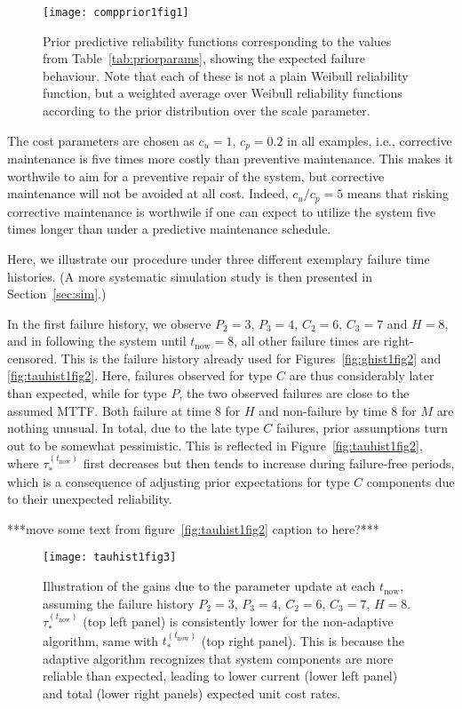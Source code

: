 \documentclass[authoryear]{elsarticle}
\def\tnow{t_\text{now}}
\newcommand{\tausnow}{\tau_*^{(\tnow)}}
\newcommand{\tstarnow}{t_*^{(\tnow)}}
\begin{document}
\begin{figure}
\centering
\texttt{[image: compprior1fig1]}
\caption{Prior predictive reliability functions corresponding to the values from Table~\ref{tab:priorparams},
showing the expected failure behaviour.
Note that each of these is not a plain Weibull reliability function,
but a weighted average over Weibull reliability functions according to the prior distribution over the scale parameter.}
\label{fig:compprior1fig1}
\end{figure}

The cost parameters are chosen as $c_u = 1$, $c_p = 0.2$ in all examples,
i.e., corrective maintenance is five times more costly than preventive maintenance.
This makes it worthwile to aim for a preventive repair of the system,
but corrective maintenance will not be avoided at all cost.
Indeed, $c_u / c_p = 5$ means that risking corrective maintenance is worthwile
if one can expect to utilize the system five times longer
than under a predictive maintenance schedule.

Here, we illustrate our procedure under three different exemplary failure time histories.
(A more systematic simulation study is then presented in Section~\ref{sec:sim}.)

In the first failure history, we observe
$P_2 = 3$, $P_3 = 4$, $C_2 = 6$, $C_3 = 7$ and $H = 8$,
and in following the system until $\tnow = 8$,
all other failure times are right-censored.
This is the failure history already used for Figures~\ref{fig:ghist1fig2} and \ref{fig:tauhist1fig2}.
Here, failures observed for type $C$ are thus considerably later than expected,
while for type $P$, the two observed failures are close to the assumed MTTF. 
Both failure at time $8$ for $H$ and non-failure by time $8$ for $M$ are nothing unusual.
In total, due to the late type $C$ failures, prior assumptions turn out to be somewhat pessimistic.
This is reflected in Figure~\ref{fig:tauhist1fig2},
where $\tausnow$ first decreases but then tends to increase during failure-free periods,
which is a consequence of adjusting prior expectations for type $C$ components
due to their unexpected reliability.

***move some text from figure~\ref{fig:tauhist1fig2} caption to here?***

\begin{figure}
\texttt{[image: tauhist1fig3]}
\caption{Illustration of the gains due to the parameter update at each $\tnow$,
assuming the failure history $P_2 = 3$, $P_3 = 4$, $C_2 = 6$, $C_3 = 7$, $H = 8$.
$\tausnow$ (top left panel) is consistently lower for the non-adaptive algorithm,
same with $\tstarnow$ (top right panel).
This is because the adaptive algorithm recognizes that system components are more reliable than expected,
leading to lower current (lower left panel) and total (lower right panels) expected unit cost rates.}
\label{fig:tauhist1fig3}
\end{figure}
\end{document}
